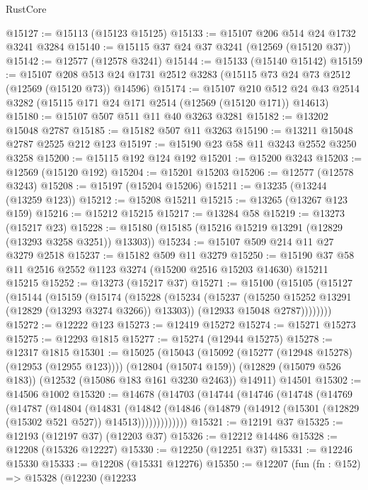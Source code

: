 \begin{lexlean}{RustCore}
\begin{coremodule}
@15127 := @15113 (@15123 @15125)
@15133 := @15107 @206 @514 @24 @1732 @3241 @3284
@15140 := @15115 @37 @24 @37 @3241 (@12569 (@15120 @37))
@15142 := @12577 (@12578 @3241)
@15144 := @15133 (@15140 @15142)
@15159 := @15107
    @208
    @513
    @24
    @1731
    @2512
    @3283
    (@15115 @73 @24 @73 @2512 (@12569 (@15120 @73)) @14596)
@15174 := @15107
    @210
    @512
    @24
    @43
    @2514
    @3282
    (@15115 @171 @24 @171 @2514 (@12569 (@15120 @171)) @14613)
@15180 := @15107 @507 @511 @11 @40 @3263 @3281
@15182 := @13202 @15048 @2787
@15185 := @15182 @507 @11 @3263
@15190 := @13211 @15048 @2787 @2525 @212 @123
@15197 := @15190 @23 @58 @11 @3243 @2552 @3250 @3258
@15200 := @15115 @192 @124 @192
@15201 := @15200 @3243
@15203 := @12569 (@15120 @192)
@15204 := @15201 @15203
@15206 := @12577 (@12578 @3243)
@15208 := @15197 (@15204 @15206)
@15211 := @13235 (@13244 (@13259 @123))
@15212 := @15208 @15211
@15215 := @13265 (@13267 @123 @159)
@15216 := @15212 @15215
@15217 := @13284 @58
@15219 := @13273 (@15217 @23)
@15228 := @15180 (@15185 (@15216 @15219 @13291 (@12829 (@13293 @3258 @3251)) @13303))
@15234 := @15107 @509 @214 @11 @27 @3279 @2518
@15237 := @15182 @509 @11 @3279
@15250 := @15190 @37 @58 @11 @2516 @2552 @1123 @3274 (@15200 @2516 @15203 @14630) @15211 @15215
@15252 := @13273 (@15217 @37)
@15271 := @15100
    (@15105
      (@15127
        (@15144
          (@15159
            (@15174
              (@15228
                (@15234
                  (@15237 (@15250 @15252 @13291 (@12829 (@13293 @3274 @3266)) @13303))
                  (@12933 @15048 @2787))))))))
@15272 := @12222 @123
@15273 := @12419 @15272
@15274 := @15271 @15273
@15275 := @12293 @1815
@15277 := @15274 (@12944 @15275)
@15278 := @12317 @1815
@15301 := @15025
    (@15043
      (@15092 (@15277 (@12948 @15278) (@12953 (@12955 @123))))
      (@12804 (@15074 @159))
      (@12829 (@15079 @526 @183))
      (@12532 (@15086 @183 @161 @3230 @2463))
      @14911)
    @14501
@15302 := @14506 @1002
@15320 := @14678
    (@14703
      (@14744
        (@14746
          (@14748
            (@14769
              (@14787
                (@14804
                  (@14831
                    (@14842
                      (@14846
                        (@14879 (@14912 (@15301 (@12829 (@15302 @521 @527)) @14513)))))))))))))
@15321 := @12191 @37
@15325 := @12193 (@12197 @37) (@12203 @37)
@15326 := @12212 @14486
@15328 := @12208 (@15326 @12227)
@15330 := @12250 (@12251 @37)
@15331 := @12246 @15330
@15333 := @12208 (@15331 @12276)
@15350 := @12207
    (fun (fn : @152) =>
    @15328
      (@12230
        (@12233

\end{coremodule}
\end{lexlean}
